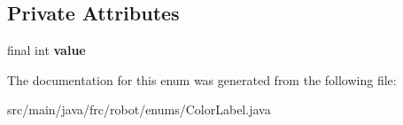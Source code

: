\subsection*{Private Attributes}
\begin{DoxyCompactItemize}
\item 
\mbox{\label{enumfrc_1_1robot_1_1enums_1_1_color_label_a4933cd47f6dc182cdcda88ba2b606c58}} 
final int {\bfseries value}
\end{DoxyCompactItemize}


The documentation for this enum was generated from the following file\+:\begin{DoxyCompactItemize}
\item 
src/main/java/frc/robot/enums/Color\+Label.\+java\end{DoxyCompactItemize}
